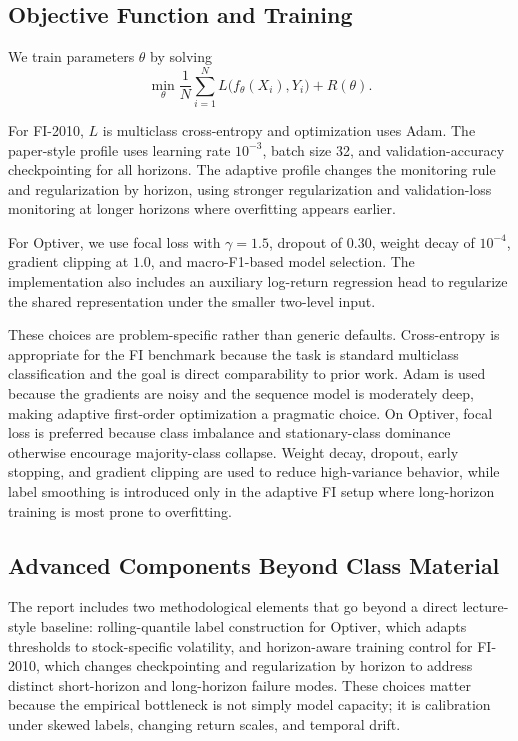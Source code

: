 \documentclass[11pt]{article}
\begin{document}
\subsection{Objective Function and Training}
We train parameters $\theta$ by solving
\[
\min_{\theta} \frac{1}{N} \sum_{i=1}^{N} L\bigl(f_{\theta}(X_i), Y_i\bigr) + R(\theta).
\]

For FI-2010, $L$ is multiclass cross-entropy and optimization uses Adam. The paper-style profile uses learning rate $10^{-3}$, batch size 32, and validation-accuracy checkpointing for all horizons. The adaptive profile changes the monitoring rule and regularization by horizon, using stronger regularization and validation-loss monitoring at longer horizons where overfitting appears earlier.

For Optiver, we use focal loss with $\gamma = 1.5$, dropout of $0.30$, weight decay of $10^{-4}$, gradient clipping at $1.0$, and macro-F1-based model selection. The implementation also includes an auxiliary log-return regression head to regularize the shared representation under the smaller two-level input.

These choices are problem-specific rather than generic defaults. Cross-entropy is appropriate for the FI benchmark because the task is standard multiclass classification and the goal is direct comparability to prior work. Adam is used because the gradients are noisy and the sequence model is moderately deep, making adaptive first-order optimization a pragmatic choice. On Optiver, focal loss is preferred because class imbalance and stationary-class dominance otherwise encourage majority-class collapse. Weight decay, dropout, early stopping, and gradient clipping are used to reduce high-variance behavior, while label smoothing is introduced only in the adaptive FI setup where long-horizon training is most prone to overfitting.

\subsection{Advanced Components Beyond Class Material}
The report includes two methodological elements that go beyond a direct lecture-style baseline: rolling-quantile label construction for Optiver, which adapts thresholds to stock-specific volatility, and horizon-aware training control for FI-2010, which changes checkpointing and regularization by horizon to address distinct short-horizon and long-horizon failure modes. These choices matter because the empirical bottleneck is not simply model capacity; it is calibration under skewed labels, changing return scales, and temporal drift.
\end{document}

